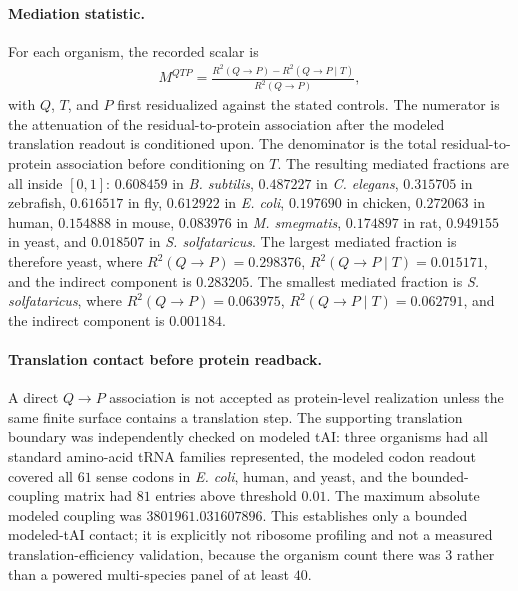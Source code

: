 \paragraph{Mediation statistic.}
For each organism, the recorded scalar is
$$
\begin{aligned}
M^{QTP}=\frac{R^2(Q\to P)-R^2(Q\to P\mid T)}{R^2(Q\to P)},
\end{aligned}
$$
with $Q$, $T$, and $P$ first residualized against the stated controls.  The numerator is the attenuation of the residual-to-protein association after the modeled translation readout is conditioned upon.  The denominator is the total residual-to-protein association before conditioning on $T$.  The resulting mediated fractions are all inside $[0,1]$: $0.608459$ in \emph{B. subtilis}, $0.487227$ in \emph{C. elegans}, $0.315705$ in zebrafish, $0.616517$ in fly, $0.612922$ in \emph{E. coli}, $0.197690$ in chicken, $0.272063$ in human, $0.154888$ in mouse, $0.083976$ in \emph{M. smegmatis}, $0.174897$ in rat, $0.949155$ in yeast, and $0.018507$ in \emph{S. solfataricus}.  The largest mediated fraction is therefore yeast, where $R^2(Q\to P)=0.298376$, $R^2(Q\to P\mid T)=0.015171$, and the indirect component is $0.283205$.  The smallest mediated fraction is \emph{S. solfataricus}, where $R^2(Q\to P)=0.063975$, $R^2(Q\to P\mid T)=0.062791$, and the indirect component is $0.001184$.

\paragraph{Translation contact before protein readback.}
A direct $Q\to P$ association is not accepted as protein-level realization unless the same finite surface contains a translation step.  The supporting translation boundary was independently checked on modeled tAI: three organisms had all standard amino-acid tRNA families represented, the modeled codon readout covered all $61$ sense codons in \emph{E. coli}, human, and yeast, and the bounded-coupling matrix had $81$ entries above threshold $0.01$.  The maximum absolute modeled coupling was $3801961.031607896$.  This establishes only a bounded modeled-tAI contact; it is explicitly not ribosome profiling and not a measured translation-efficiency validation, because the organism count there was $3$ rather than a powered multi-species panel of at least $40$.

